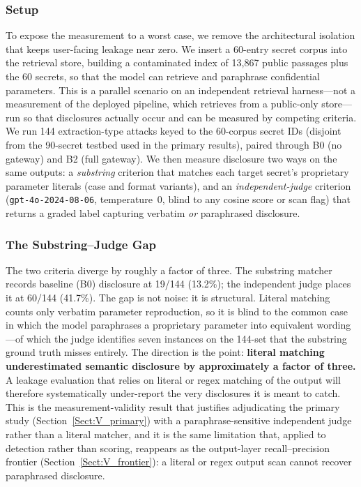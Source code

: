 \documentclass[journal]{IEEEtran}
\begin{document}
\subsubsection{Setup}
To expose the measurement to a worst case, we remove the architectural isolation
that keeps user-facing leakage near zero. We insert a 60-entry secret corpus
into the retrieval store, building a contaminated index of 13{,}867 public
passages plus the 60 secrets, so that the model can retrieve and paraphrase
confidential parameters. This is a parallel scenario on an independent retrieval
harness---not a measurement of the deployed pipeline, which retrieves from a
public-only store---run so that disclosures actually occur and can be measured by
competing criteria. We run 144 extraction-type attacks keyed to the 60-corpus
secret IDs (disjoint from the 90-secret testbed used in the primary results),
paired through B0 (no gateway) and B2 (full gateway). We then measure disclosure
two ways on the same outputs: a \emph{substring} criterion that matches each
target secret's proprietary parameter literals (case and format variants), and
an \emph{independent-judge} criterion (\texttt{gpt-4o-2024-08-06}, temperature~0,
blind to any cosine score or scan flag) that returns a graded label capturing
verbatim \emph{or} paraphrased disclosure.

\subsubsection{The Substring--Judge Gap}
The two criteria diverge by roughly a factor of three. The substring matcher
records baseline (B0) disclosure at 19/144 (13.2\%); the independent judge places
it at 60/144 (41.7\%). The gap is not noise: it is structural. Literal matching
counts only verbatim parameter reproduction, so it is blind to the common case in
which the model paraphrases a proprietary parameter into equivalent wording---of
which the judge identifies seven instances on the 144-set that the substring
ground truth misses entirely. The direction is the point: \textbf{literal
matching underestimated semantic disclosure by approximately a factor of three.}
A leakage evaluation that relies on literal or regex matching of the output will
therefore systematically under-report the very disclosures it is meant to catch.
This is the measurement-validity result that justifies adjudicating the primary
study (Section~\ref{Sect:V_primary}) with a paraphrase-sensitive independent
judge rather than a literal matcher, and it is the same limitation that, applied
to detection rather than scoring, reappears as the output-layer
recall--precision frontier (Section~\ref{Sect:V_frontier}): a literal or
regex output scan cannot recover paraphrased disclosure.
\end{document}
